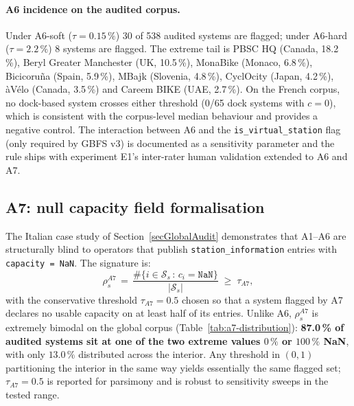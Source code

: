 \documentclass[11pt,a4paper]{article}
\begin{document}
\paragraph{A6 incidence on the audited corpus.}
Under A6-soft ($\tau = 0.15\,\%$) 30 of 538 audited systems are
flagged; under A6-hard ($\tau = 2.2\,\%$) 8 systems are flagged. The
extreme tail is PBSC HQ (Canada, 18.2\,\%), Beryl Greater Manchester
(UK, 10.5\,\%), MonaBike (Monaco, 6.8\,\%), Bicicoru\~na (Spain,
5.9\,\%), MBajk (Slovenia, 4.8\,\%), CyclOcity (Japan, 4.2\,\%),
\`aV\'elo (Canada, 3.5\,\%) and Careem BIKE (UAE, 2.7\,\%). On the
French corpus, no dock-based system crosses either threshold
(0/65 dock systems with $c = 0$), which is consistent with the
corpus-level median behaviour and provides a negative control.
The interaction between A6 and the \texttt{is\_virtual\_station}
flag (only required by GBFS v3) is documented as a sensitivity
parameter and the rule ships with experiment E1's inter-rater
human validation extended to A6 and A7.

\subsection{A7: null capacity field formalisation}\label{secA7Formalisation}
The Italian case study of Section~\ref{secGlobalAudit} demonstrates
that A1--A6 are structurally blind to operators that publish
\texttt{station\_information} entries with \texttt{capacity =
NaN}. The signature is:
\begin{equation}
\rho_s^{A7} \,=\,
\frac{\#\{i \in \mathcal{S}_s \,:\, c_i = \mathtt{NaN}\}}{|\mathcal{S}_s|}
\;\geq\; \tau_{A7},
\end{equation}
with the conservative threshold $\tau_{A7} = 0.5$ chosen so that a
system flagged by A7 declares no usable capacity on at least half
of its entries. Unlike A6, $\rho_s^{A7}$ is extremely bimodal on
the global corpus
(Table~\ref{tab:a7-distribution}): \textbf{87.0\,\% of audited
systems sit at one of the two extreme values $0\,\%$ or $100\,\%$
NaN}, with only $13.0\,\%$ distributed across the interior. Any
threshold in $(0, 1)$ partitioning the interior in the same way
yields essentially the same flagged set; $\tau_{A7} = 0.5$ is
reported for parsimony and is robust to sensitivity sweeps in the
tested range.
\end{document}
